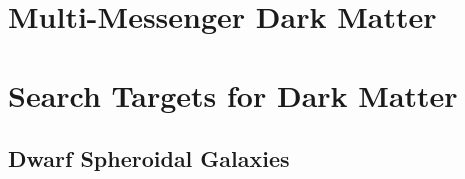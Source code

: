 \section{Multi-Messenger Dark Matter}

\section{Search Targets for Dark Matter\label{sec:dm_targets}}

\subsection{Dwarf Spheroidal Galaxies\label{sec:dSphs}}
